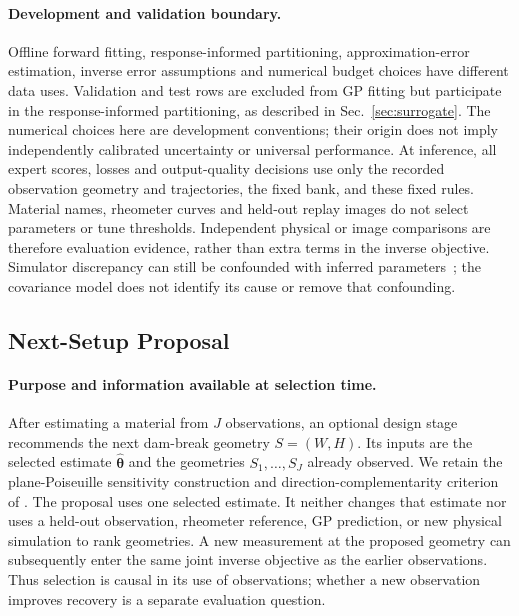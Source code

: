 \paragraph{Development and validation boundary.}
\label{sec:no-leakage-boundary}
Offline forward fitting, response-informed partitioning, approximation-error
estimation, inverse error assumptions and numerical budget choices have
different data uses. Validation and test rows are excluded from GP fitting
but participate in the response-informed partitioning, as described in
Sec.~\ref{sec:surrogate}.
The numerical choices here are development conventions; their origin does
not imply independently calibrated uncertainty or universal performance.
At inference, all expert scores, losses and output-quality decisions use
only the recorded observation geometry and trajectories, the fixed bank,
and these fixed rules. Material names, rheometer curves and held-out
replay images do not select parameters or tune thresholds. Independent
physical or image comparisons are therefore evaluation evidence, rather
than extra terms in the inverse objective. Simulator discrepancy can
still be confounded with inferred parameters~\cite{kennedy2001bayesian,
brynjarsdottir2014discrepancy}; the covariance model does not identify
its cause or remove that confounding.

\subsection{Next-Setup Proposal}
\label{sec:proposer}

\paragraph{Purpose and information available at selection time.}
After estimating a material from $J$ observations, an optional design
stage recommends the next dam-break geometry $S=(W,H)$. Its inputs are
the selected estimate $\widehat{\boldsymbol\theta}$ and the geometries
$S_1,\ldots,S_J$ already observed. We retain the plane-Poiseuille
sensitivity construction and direction-complementarity criterion of
\citet{hamamichi2023nonnewtonian}. The proposal uses one selected
estimate. It neither changes that estimate nor uses a held-out
observation, rheometer reference, GP prediction, or new physical simulation
to rank geometries. A new measurement at the proposed geometry can
subsequently enter the same joint inverse objective as the earlier
observations. Thus selection is causal in its use of observations;
whether a new observation improves recovery is a separate evaluation
question.


